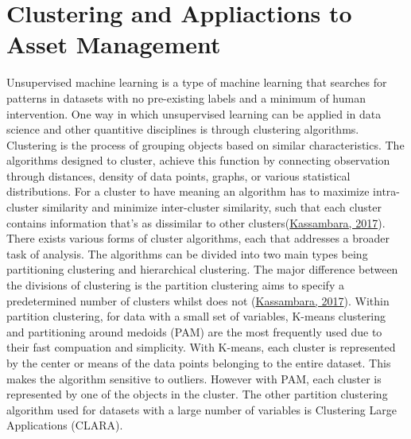 \documentclass[11pt,preprint, authoryear]{elsarticle}
\numberwithin{equation}{section}
\numberwithin{figure}{section}
\numberwithin{table}{section}
\begin{document}
\hypertarget{clustering-and-appliactions-to-asset-management}{%
\section{\texorpdfstring{Clustering and Appliactions to Asset Management
\label{lit}}{Clustering and Appliactions to Asset Management }}\label{clustering-and-appliactions-to-asset-management}}

Unsupervised machine learning is a type of machine learning that
searches for patterns in datasets with no pre-existing labels and a
minimum of human intervention. One way in which unsupervised learning
can be applied in data science and other quantitive disciplines is
through clustering algorithms. Clustering is the process of grouping
objects based on similar characteristics. The algorithms designed to
cluster, achieve this function by connecting observation through
distances, density of data points, graphs, or various statistical
distributions. For a cluster to have meaning an algorithm has to
maximize intra-cluster similarity and minimize inter-cluster similarity,
such that each cluster contains information that's as dissimilar to
other
clusters(\protect\hyperlink{ref-kassambara2017practical}{Kassambara,
2017}). There exists various forms of cluster algorithms, each that
addresses a broader task of analysis. The algorithms can be divided into
two main types being partitioning clustering and hierarchical
clustering. The major difference between the divisions of clustering is
the partition clustering aims to specify a predetermined number of
clusters whilst does not
(\protect\hyperlink{ref-kassambara2017practical}{Kassambara, 2017}).
Within partition clustering, for data with a small set of variables,
K-means clustering and partitioning around medoids (PAM) are the most
frequently used due to their fast compuation and simplicity. With
K-means, each cluster is represented by the center or means of the data
points belonging to the entire dataset. This makes the algorithm
sensitive to outliers. However with PAM, each cluster is represented by
one of the objects in the cluster. The other partition clustering
algorithm used for datasets with a large number of variables is
Clustering Large Applications (CLARA).
\end{document}

